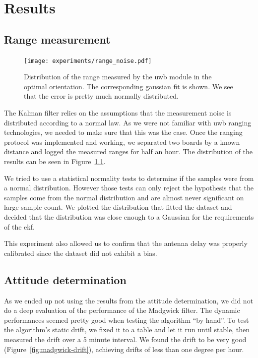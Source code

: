 \documentclass[a4paper, 12pt]{scrreprt}
\begin{document}
\chapter{Results}

\section{Range measurement}
\label{sec:range_result}

\begin{figure}[h]
    \centering
    \texttt{[image: experiments/range\_noise.pdf]}
    \caption{Distribution of the range measured by the \gls{uwb} module in the optimal orientation.
        The corresponding gaussian fit is shown.
        We see that the error is pretty much normally distributed.
    }
    \label{fig:range_noise}
\end{figure}

The Kalman filter relies on the assumptions that the measurement noise is distributed according to a normal law.
As we were not familiar with \gls{uwb} ranging technologies, we needed to make sure that this was the case.
Once the ranging protocol was implemented and working, we separated two boards by a known distance and logged the measured ranges for half an hour.
The distribution of the results can be seen in Figure~\ref{fig:range_noise}.

We tried to use a statistical normality tests to determine if the samples were from a normal distribution.
However those tests can only reject the hypothesis that the samples come from the normal distribution and are almost never significant on large sample count.
We plotted the distribution that fitted the dataset and decided that the distribution was close enough to a Gaussian for the requirements of the \gls{ekf}.

This experiment also allowed us to confirm that the antenna delay was properly calibrated since the dataset did not exhibit a bias.



\section{Attitude determination}

As we ended up not using the results from the attitude determination, we did not do a deep evaluation of the performance of the Madgwick filter.
The dynamic performances seemed pretty good when testing the algorithm ``by hand''.
To test the algorithm's static drift, we fixed it to a table and let it run until stable, then measured the drift over a 5 minute interval.
We found the drift to be very good (Figure~\ref{fig:madgwick-drift}), achieving drifts of less than one degree per hour.
\end{document}
